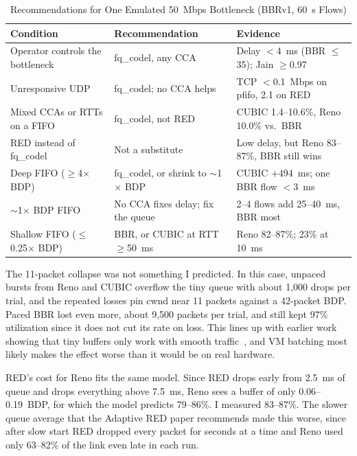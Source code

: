 \documentclass[conference,12pt,letterpaper]{IEEEtran}
\newcommand{\x}{\ensuremath{\times}}
\begin{document}
\begin{table}[t]
\caption{Recommendations for One Emulated 50~Mbps Bottleneck (BBRv1, 60~s Flows)}
\label{tab:rec}
\centering
\begin{tabular}{@{}L{4.6cm}L{5.4cm}L{6.0cm}@{}}
\toprule
Condition & Recommendation & Evidence \\
\midrule
Operator controls the bottleneck & fq\_codel, any CCA & Delay $<$4~ms (BBR $\leq$35); Jain $\geq$0.97 \\
Unresponsive UDP & fq\_codel; no CCA helps & TCP $<$0.1~Mbps on pfifo, 2.1 on RED \\
Mixed CCAs or RTTs on a FIFO & fq\_codel, not RED & CUBIC 1.4--10.6\%, Reno 10.0\% vs.\ BBR \\
RED instead of fq\_codel & Not a substitute & Low delay, but Reno 83--87\%, BBR still wins \\
Deep FIFO ($\geq$4\x{} BDP) & fq\_codel, or shrink to $\sim$1\x{} BDP & CUBIC +494~ms; one BBR flow $<$3~ms \\
$\sim$1\x{} BDP FIFO & No CCA fixes delay; fix the queue & 2--4 flows add 25--40~ms, BBR most \\
Shallow FIFO ($\leq$0.25\x{} BDP) & BBR, or CUBIC at RTT $\geq$50~ms & Reno 82--87\%; 23\% at 10~ms \\
\bottomrule
\end{tabular}
\end{table}

The 11-packet collapse was not something I predicted. In this case, unpaced bursts from Reno and CUBIC overflow the tiny queue with about 1,000 drops per trial, and the repeated losses pin cwnd near 11 packets against a 42-packet BDP. Paced BBR lost even more, about 9,500 packets per trial, and still kept 97\% utilization since it does not cut its rate on loss. This lines up with earlier work showing that tiny buffers only work with smooth traffic~\cite{enachescu}, and VM batching most likely makes the effect worse than it would be on real hardware.

RED's cost for Reno fits the same model. Since RED drops early from 2.5~ms of queue and drops everything above 7.5~ms, Reno sees a buffer of only 0.06--0.19~BDP, for which the model predicts 79--86\%. I measured 83--87\%. The slower queue average that the Adaptive RED paper recommends made this worse, since after slow start RED dropped every packet for seconds at a time and Reno used only 63--82\% of the link even late in each run.
\end{document}

